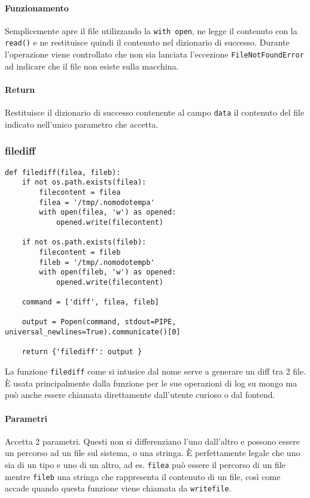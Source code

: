 \documentclass[11pt]{article}
\begin{document}
\paragraph{Funzionamento}
Semplicemente apre il file utilizzando la \texttt{with open}, ne legge il contenuto con la \texttt{read()} e ne restituisce
quindi il contenuto nel dizionario di successo.
Durante l'operazione viene controllato che non sia lanciata l'eccezione \texttt{FileNotFoundError} ad indicare che il file
non esiste sulla macchina.
\paragraph{Return}
Restituisce il dizionario di successo contenente al campo \texttt{data} il contenuto del file indicato nell'unico
parametro che accetta.

\subsubsection{filediff}\label{filediff}
\begin{lstlisting}
def filediff(filea, fileb):
    if not os.path.exists(filea):
        filecontent = filea
        filea = '/tmp/.nomodotempa'
        with open(filea, 'w') as opened:
            opened.write(filecontent)

    if not os.path.exists(fileb):
        filecontent = fileb
        fileb = '/tmp/.nomodotempb'
        with open(fileb, 'w') as opened:
            opened.write(filecontent)

    command = ['diff', filea, fileb]

    output = Popen(command, stdout=PIPE, universal_newlines=True).communicate()[0]

    return {'filediff': output }
\end{lstlisting}
La funzione \texttt{filediff} come si intusice dal nome serve a generare un diff tra 2 file. È usata principalmente dalla funzione 
per le sue operazioni di log su mongo ma può anche essere chiamata direttamente dall'utente curioso o dal fontend.
\paragraph{Parametri}
Accetta 2 parametri. Questi non si differenziano l'uno dall'altro e possono essere un percorso ad un file sul sistema, o una stringa.
È perfettamente legale che uno sia di un tipo e uno di un altro, ad es. \texttt{filea} può essere il percorso di un file mentre \texttt{fileb}
una stringa che rappresenta il contenuto di un file, così come accade quando questa funzione viene chiamata da \texttt{writefile}.
\end{document}
